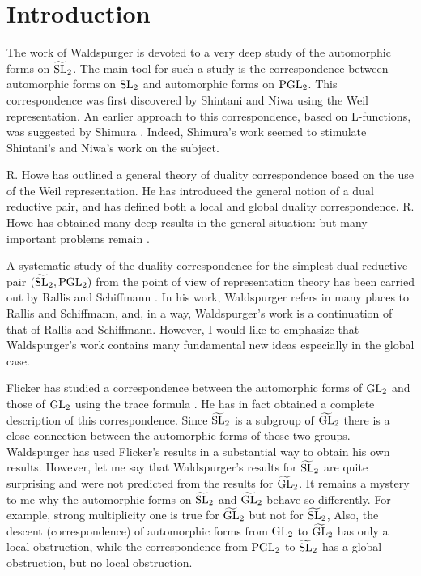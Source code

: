 \section{Introduction}


The work of Waldspurger \cite{waldspurger78theta,waldspurger80shimura,waldspurger81demientier,waldspurger84shimura,waldspurger91quaternion} is devoted to a very deep study of the automorphic forms on $\widetilde{\mathrm{SL}}_2$.
The main tool for such a study is the correspondence between automorphic forms on $\mathrm{SL}_2$ and automorphic forms on $\mathrm{PGL}_2$.
This correspondence was first discovered by Shintani and Niwa using the Weil representation.
An earlier approach to this correspondence, based on L-functions, was suggested by Shimura \cite{shimura73half}.
Indeed, Shimura's work seemed to stimulate Shintani's and Niwa's work on the subject.

R. Howe has outlined a general theory of duality correspondence based on the use of the Weil representation. 
He has introduced the general notion of a dual reductive pair, and has defined both a local and global duality correspondence.
R. Howe has obtained many deep results in the general situation: but many important problems remain \cite{howe79theta}.

A systematic study of the duality correspondence for the simplest dual reductive pair $(\widetilde{\mathrm{SL}}_2, \mathrm{PGL}_2)$ from the point of view of representation theory has been carried out by Rallis and Schiffmann \cite{rs77metaplectic}.
In his work, Waldspurger refers in many places to Rallis and Schiffmann, and, in a way, Waldspurger's work is a continuation of that of Rallis and Schiffmann.
However, I would like to emphasize that Waldspurger's work contains many fundamental new ideas especially in the global case.

Flicker has studied a correspondence between the automorphic forms of $\mathrm{GL}_2$ and those of $\mathrm{GL}_2$ using the trace formula \cite{flicker80covering}.
He has in fact obtained a complete description of this correspondence.
Since $\widetilde{\mathrm{SL}}_2$ is a subgroup of $\widetilde{\mathrm{GL}}_2$ there is a close connection between the automorphic forms of these two groups.
Waldspurger has used Flicker's results in a substantial way to obtain his own results.
However, let
me say that Waldspurger's results for $\widetilde{\mathrm{SL}}_2$ are quite surprising and were not predicted from the results for $\widetilde{\mathrm{GL}}_2$.
It remains a mystery to me why the automorphic forms on $\widetilde{\mathrm{SL}}_2$ and $\widetilde{\mathrm{GL}}_2$ behave so differently.
For example, strong multiplicity one is true for $\widetilde{\mathrm{GL}}_2$ but not for $\widetilde{\mathrm{SL}}_2$,
Also, the descent (correspondence) of automorphic forms from $\mathrm{GL}_2$ to $\widetilde{\mathrm{GL}}_2$ has only a local obstruction, while the correspondence from $\mathrm{PGL}_2$ to $\widetilde{\mathrm{SL}}_2$ has a global obstruction, but no local obstruction.

